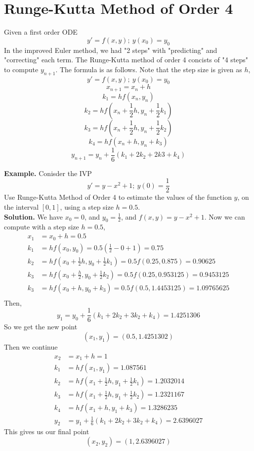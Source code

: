 \documentclass[openany]{report}
\begin{document}
\section{Runge-Kutta Method of Order 4}

Given a first order ODE 
\[y' = f(x,y); \ y(x_0) = y_0\]
In the improved Euler method, we had "2 steps" with "predicting" and "correcting" each term. The Runge-Kutta method of order 4 concists of "4 steps" to compute $y_{n+1}$. The formula is as follows. Note that the step size is given as $h$, 
\[y' = f(x,y) ; \ y(x_0) = y_0\]
\[x_{n+1} = x_n + h\]
\[k_1 = hf(x_n,y_n)\]
\[k_2 = hf\left(x_n + \frac{1}{2}h, y_n + \frac{1}{2}k_1\right)\]
\[k_3 = hf\left(x_n + \frac{1}{2}h, y_n + \frac{1}{2}k_2\right)\]
\[k_4 = hf\left(x_n + h, y_n + k_3\right)\]
\[y_{n+1} = y_n + \frac{1}{6}(k_1 + 2k_2 + 2k3 + k_4)\]

\noindent
\textbf{Example.} Conisder the IVP 
\[y' = y - x^2 + 1; \ y(0) = \frac{1}{2}\]
Use Runge-Kutta Method of Order 4 to estimate the values of the function $y$, on the interval $[0,1]$, using a step size $h = 0.5$.\\[-2ex]

\noindent
\textbf{Solution.}
We have $x_0 = 0$, and $y_0 = \frac{1}{2}$, and $f(x,y) = y -x^2 + 1$. Now we can compute with a step size $h = 0.5$,
\begin{align*}
    x_1 &= x_0 + h = 0.5 \\
    k_1 &= hf(x_0, y_0) = 0.5(\frac{1}{2} - 0 + 1) = 0.75\\
    k_2 &= hf\left(x_0 + \frac{1}{2}h, y_0 + \frac{1}{2}k_1\right) = 0.5f(0.25,0.875) = 0.90625\\
    k_3 &= hf\left(x_0 + \frac{h}{2}, y_0 + \frac{1}{2}k_2\right) = 0.5f(0.25, 0.953125) = 0.9453125\\
    k_3 &= hf\left(x_0 + h, y_0 + k_3\right) = 0.5f(0.5, 1.4453125) = 1.09765625\\
\end{align*}
Then, 
\[y_1 = y_0 + \frac{1}{6}(k_1 + 2k_2 + 3k_2 + k_4) = 1.4251306\]
So we get the new point 
\[(x_1,y_1) = (0.5, 1.4251302)\]
Then we continue 
\begin{align*}
    x_2 &= x_1 + h = 1\\
    k_1 &= hf(x_1, y_1) = 1.087561 \\
    k_2 &= hf\left(x_1 + \frac{1}{2}h, y_1 + \frac{1}{2}k_1\right) = 1.2032014\\
    k_3 &= hf\left(x_1 + \frac{1}{2}h, y_1 + \frac{1}{2}k_2\right) = 1.2321167\\
    k_4 &= hf(x_1 + h, y_1 + k_3) = 1.3286235\\
    y_2 &= y_1 + \frac{1}{6}(k_1 + 2k_2 + 3k_2 + k_4) = 2.6396027
\end{align*}
This gives us our final point 
\[(x_2, y_2) = (1, 2.6396027)\]
\end{document}
